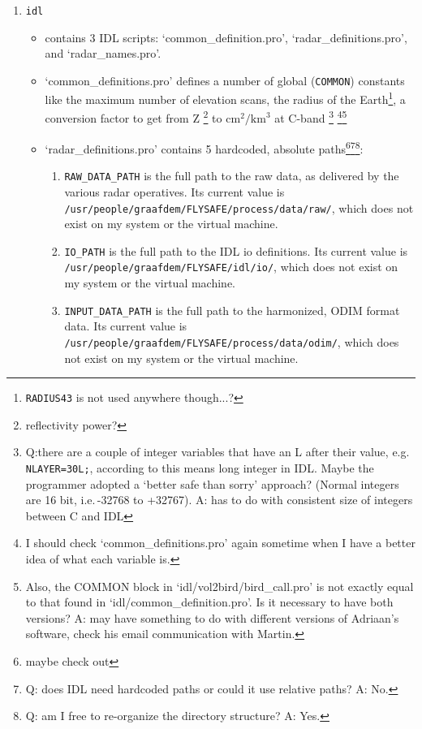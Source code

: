 \begin{enumerate}
\item{\texttt{idl}}
\begin{itemize}
\item{contains 3 IDL scripts: `common\_definition.pro', `radar\_definitions.pro', and `radar\_names.pro'.}
\item{`common\_definitions.pro' defines a number of global (\texttt{COMMON}) constants like the maximum number of elevation scans, the radius of the Earth\footnote{\texttt{RADIUS43} is not used anywhere though...?}, a conversion factor to get from Z
\footnote{reflectivity power?} to $\mathrm{cm}^2/\mathrm{km}^3$ at C-band \footnote{Q:there are a couple of integer variables that have an L after their value, e.g. \texttt{NLAYER=30L;}, according to  this means long integer in IDL. Maybe the programmer adopted a `better safe than sorry' approach? (Normal integers are 16 bit, i.e.\,-32768 to +32767). A: has to do with consistent size of integers between C and IDL} \footnote{I should check `common\_definitions.pro' again sometime when I have a better idea of what each variable is.}\footnote{Also, the COMMON block in `idl/vol2bird/bird\_call.pro' is not exactly equal to that found in `idl/common\_definition.pro'. Is it necessary to have both versions? A: may have something to do with different versions of Adriaan's software, check his email communication with Martin.}}
\item{`radar\_definitions.pro' contains 5 hardcoded, absolute paths\footnote{maybe check out }\footnote{Q: does IDL need hardcoded paths or could it use relative paths? A: No.}\footnote{Q: am I free to re-organize the directory structure? A: Yes.}:}
\begin{enumerate}
\item{\texttt{RAW\_DATA\_PATH} is the full path to the raw data, as delivered by the various radar operatives. Its current value is \texttt{/usr/people/graafdem/FLYSAFE/process/data/raw/}, which does not exist on my system or the virtual machine.}
\item{\texttt{IO\_PATH} is the full path to the IDL io definitions. Its current value is \texttt{/usr/people/graafdem/FLYSAFE/idl/io/}, which does not exist on my system or the virtual machine.}
\item{\texttt{INPUT\_DATA\_PATH} is the full path to the harmonized, ODIM format data. Its current value is \texttt{/usr/people/graafdem/FLYSAFE/process/data/odim/}, which does not exist on my system or the virtual machine.}

\end{enumerate}
\end{itemize}
\end{enumerate}
